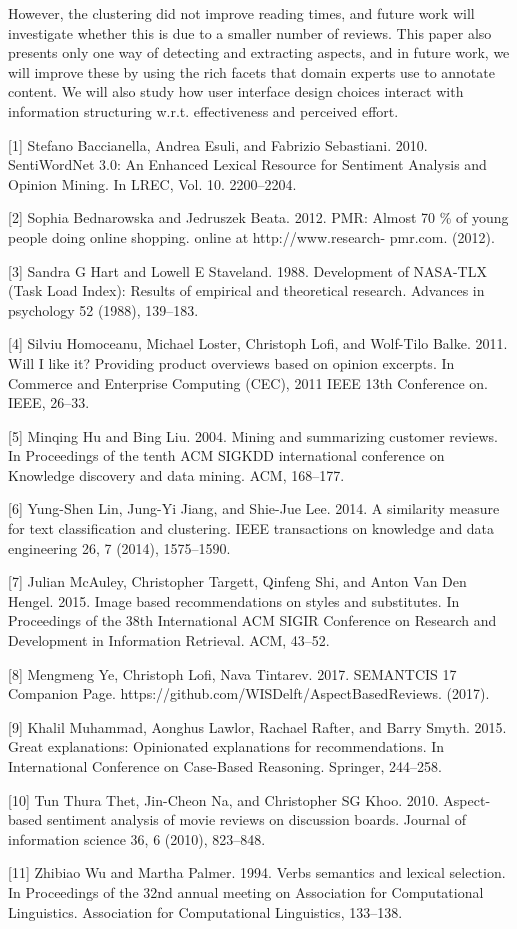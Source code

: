 \documentclass[runningheads,a4paper]{llncs}
\begin{document}
However, the clustering did not improve reading times, and future work will investigate whether this is due to a smaller number of reviews. This paper also presents only one way of detecting and extracting aspects, and in future work, we will improve these by using the rich facets that domain experts use to annotate content. We will also study how user interface design choices interact with information structuring w.r.t. effectiveness and perceived effort.

\begin{thebibliography}{4}


[1]  Stefano Baccianella, Andrea Esuli, and Fabrizio Sebastiani. 2010. SentiWordNet 3.0: An Enhanced Lexical Resource for Sentiment Analysis and Opinion Mining. In LREC, Vol. 10. 2200--2204.

[2]  Sophia Bednarowska and Jedruszek Beata. 2012. PMR: Almost 70 \% of young people doing online shopping. online at http://www.research- pmr.com. (2012).

[3]  Sandra G Hart and Lowell E Staveland. 1988. Development of NASA-TLX (Task Load Index): Results of empirical and theoretical research. Advances in psychology 52 (1988), 139--183.

[4]  Silviu Homoceanu, Michael Loster, Christoph Lofi, and Wolf-Tilo Balke. 2011. Will I like it? Providing product overviews based on opinion excerpts. In Commerce and Enterprise Computing (CEC), 2011 IEEE 13th Conference on. IEEE, 26--33.

[5]  Minqing Hu and Bing Liu. 2004. Mining and summarizing customer reviews. In Proceedings of the tenth ACM SIGKDD international conference on Knowledge discovery and data mining. ACM, 168--177.

[6]  Yung-Shen Lin, Jung-Yi Jiang, and Shie-Jue Lee. 2014. A similarity measure for text classification and clustering. IEEE transactions on knowledge and data engineering  26, 7 (2014), 1575--1590.

[7]  Julian McAuley, Christopher Targett, Qinfeng Shi, and Anton Van Den Hengel. 2015. Image based recommendations on styles and substitutes. In Proceedings of the 38th International ACM SIGIR Conference on Research and Development in Information Retrieval. ACM, 43--52.

[8]  Mengmeng Ye, Christoph Lofi, Nava Tintarev. 2017. SEMANTCIS 17 Companion Page. https://github.com/WISDelft/AspectBasedReviews. (2017).

[9]  Khalil Muhammad, Aonghus Lawlor, Rachael Rafter, and Barry Smyth. 2015. Great explanations: Opinionated explanations for recommendations. In International Conference on Case-Based Reasoning. Springer, 244--258.

[10]  Tun Thura Thet, Jin-Cheon Na, and Christopher SG Khoo. 2010. Aspect-based sentiment analysis of movie reviews on discussion boards. Journal of information science 36, 6 (2010), 823--848.

[11]  Zhibiao Wu and Martha Palmer. 1994. Verbs semantics and lexical selection. In Proceedings of the 32nd annual meeting on Association for Computational Linguistics. Association for Computational Linguistics, 133--138.

\end{thebibliography}
\end{document}
